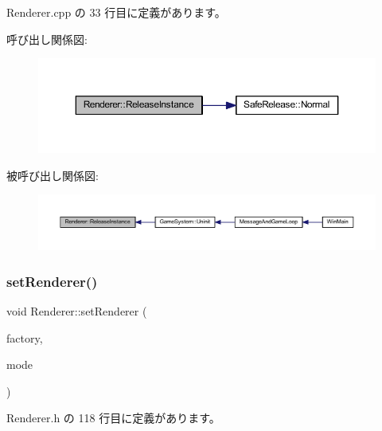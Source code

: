  Renderer.\+cpp の 33 行目に定義があります。

呼び出し関係図\+:\nopagebreak
\begin{figure}[H]
\begin{center}
\leavevmode
\includegraphics[width=350pt]{class_renderer_aa7ac523172faaf376ecddaed4bdc0781_cgraph}
\end{center}
\end{figure}
被呼び出し関係図\+:\nopagebreak
\begin{figure}[H]
\begin{center}
\leavevmode
\includegraphics[width=350pt]{class_renderer_aa7ac523172faaf376ecddaed4bdc0781_icgraph}
\end{center}
\end{figure}
\mbox{\label{class_renderer_a02e3c483b2c9d8024e51639a06159066}} 
\subsubsection{\texorpdfstring{set\+Renderer()}{setRenderer()}}
{\footnotesize\ttfamily void Renderer\+::set\+Renderer (\begin{DoxyParamCaption}\item[{\mbox{\hyperlink{class_renderer_factory_interface}{Renderer\+Factory\+Interface}} $\ast$}]{factory,  }\item[{\mbox{\hyperlink{class_renderer_ab5a9379ccadcf2b3394c61cf8c835fec}{M\+O\+DE}}}]{mode }\end{DoxyParamCaption})\hspace{0.3cm}{\ttfamily [inline]}}



 Renderer.\+h の 118 行目に定義があります。

